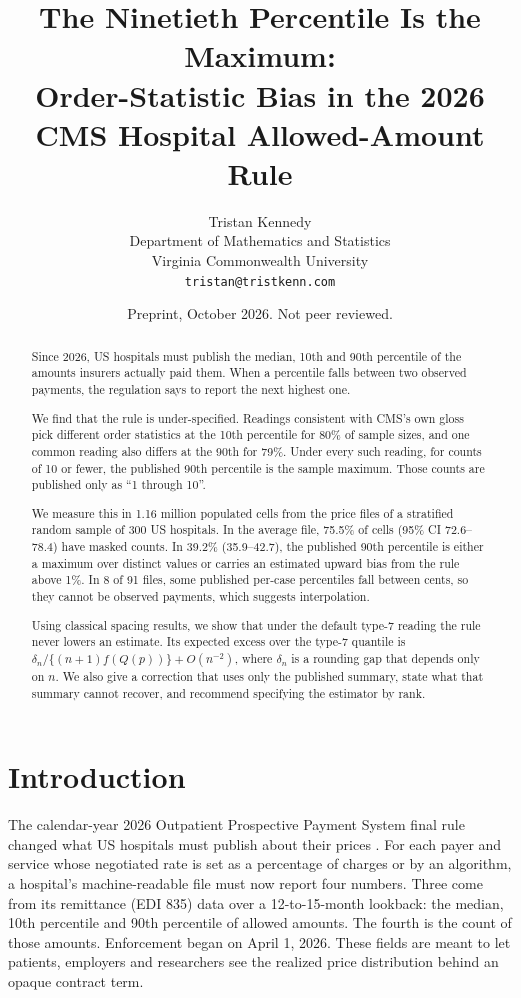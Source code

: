 \documentclass[11pt]{article}
\title{The Ninetieth Percentile Is the Maximum:\\ Order-Statistic Bias in the 2026 CMS Hospital Allowed-Amount Rule}
\author{Tristan Kennedy\\ Department of Mathematics and Statistics\\ Virginia Commonwealth University\\ \texttt{tristan@tristkenn.com}}
\date{Preprint, October 2026. Not peer reviewed.}
\theoremstyle{remark}
\begin{document}
\maketitle

\begin{abstract}
Since 2026, US hospitals must publish the median, 10th and 90th percentile of the amounts insurers actually paid them. When a percentile falls between two observed payments, the regulation says to report the next highest one.

We find that the rule is under-specified. Readings consistent with CMS's own gloss pick different order statistics at the 10th percentile for 80\% of sample sizes, and one common reading also differs at the 90th for 79\%. Under every such reading, for counts of 10 or fewer, the published 90th percentile is the sample maximum. Those counts are published only as ``1 through 10''.

We measure this in 1.16 million populated cells from the price files of a stratified random sample of 300 US hospitals. In the average file, 75.5\% of cells (95\% CI 72.6--78.4) have masked counts. In 39.2\% (35.9--42.7), the published 90th percentile is either a maximum over distinct values or carries an estimated upward bias from the rule above 1\%. In 8 of 91 files, some published per-case percentiles fall between cents, so they cannot be observed payments, which suggests interpolation.

Using classical spacing results, we show that under the default type-7 reading the rule never lowers an estimate. Its expected excess over the type-7 quantile is $\delta_n/\{(n+1)f(Q(p))\}+O(n^{-2})$, where $\delta_n$ is a rounding gap that depends only on $n$. We also give a correction that uses only the published summary, state what that summary cannot recover, and recommend specifying the estimator by rank.
\end{abstract}

\section{Introduction}

The calendar-year 2026 Outpatient Prospective Payment System final rule changed what US hospitals must publish about their prices \citep{fr2025}. For each payer and service whose negotiated rate is set as a percentage of charges or by an algorithm, a hospital's machine-readable file must now report four numbers. Three come from its remittance (EDI 835) data over a 12-to-15-month lookback: the median, 10th percentile and 90th percentile of allowed amounts. The fourth is the count of those amounts. Enforcement began on April 1, 2026. These fields are meant to let patients, employers and researchers see the realized price distribution behind an opaque contract term.
\end{document}
